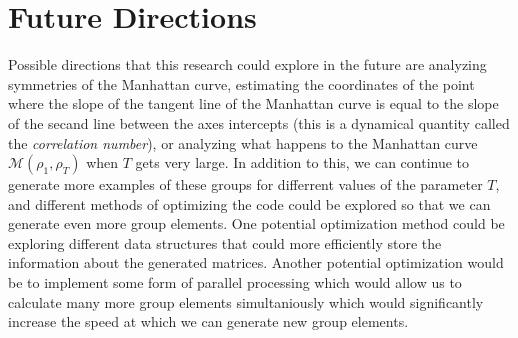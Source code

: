 \documentclass{amsart}
\begin{document}
	\section{Future Directions}
	
	Possible directions that this research could explore in the future are analyzing symmetries of the Manhattan curve, estimating the coordinates of the point where the slope of the tangent line of the Manhattan curve is equal to the slope of the secand line between the axes intercepts (this is a dynamical quantity called the \emph{correlation number}), or analyzing what happens to the Manhattan curve $\mathcal{M}(\rho_1,\rho_T)$ when $T$ gets very large. In addition to this, we can continue to generate more examples of these groups for differrent values of the parameter $T$, and different methods of optimizing the code could be explored so that we can generate even more group elements. One potential optimization method could be exploring different data structures that could more efficiently store the information about the generated matrices. Another potential optimization would be to implement some form of parallel processing which would allow us to calculate many more group elements simultaniously which would significantly increase the speed at which we can generate new group elements.
	\newpage
	\printbibliography
	
\end{document}
